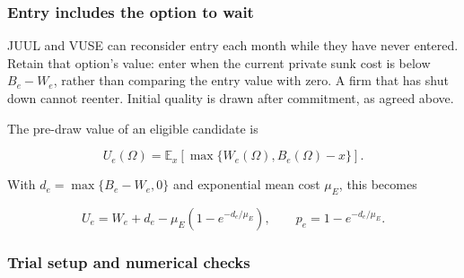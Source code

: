 \documentclass[10pt,]{article}
\begin{document}
\subsubsection{Entry includes the option to
wait}\label{entry-includes-the-option-to-wait}

JUUL and VUSE can reconsider entry each month while they have never
entered. Retain that option's value: enter when the current private sunk
cost is below \(B_e-W_e\), rather than comparing the entry value with
zero. A firm that has shut down cannot reenter. Initial quality is drawn
after commitment, as agreed above.

The pre-draw value of an eligible candidate is

\[
U_e(\Omega)=\mathbb E_x\left[\max\{W_e(\Omega),B_e(\Omega)-x\}\right].
\]

With \(d_e=\max\{B_e-W_e,0\}\) and exponential mean cost \(\mu_E\), this
becomes

\[
U_e=W_e+d_e-\mu_E\left(1-e^{-d_e/\mu_E}\right),
\qquad p_e=1-e^{-d_e/\mu_E}.
\]

\subsubsection{Trial setup and numerical
checks}\label{trial-setup-and-numerical-checks}
\end{document}
